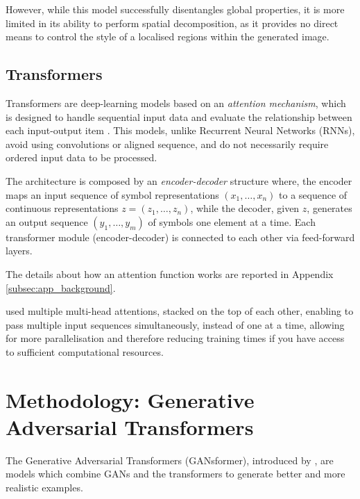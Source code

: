 \documentclass{article}
\begin{document}
	However, while this model successfully disentangles global properties, it is more limited in its ability 
	to perform spatial decomposition, as it provides no direct means to control the style of a localised 
	regions within the generated image.
	
	\subsection{Transformers}\label{sec:transformer}
	Transformers are deep-learning models based on an \textit{attention mechanism}, which is 
	designed 
	to handle sequential input data and evaluate the relationship between each input-output item 
	\cite{vaswani2017attention}.
	This models, unlike Recurrent Neural Networks (RNNs), avoid using convolutions or aligned 
	sequence, and do not necessarily require ordered input data to be processed. 
	
	The architecture is composed by an \textit{encoder-decoder} structure where, the {encoder} 
	maps 
	an input sequence of symbol representations $(x_1,\dots, x_n)$ to a sequence of continuous 
	representations $z = (z_1, \dots, z_n)$, while the  {decoder}, given $z$, generates an output 
	sequence $(y_1, \dots, y_m)$ of symbols one element at a time. 
	Each transformer module (encoder-decoder) is connected to each other via feed-forward 
	layers.
	
	The details about how an attention function works are reported in Appendix 
	\ref{subsec:app_background}. 
	
	\citet{vaswani2017attention} used multiple multi-head attentions, stacked on the top of each 
	other, 
	enabling to pass multiple input sequences simultaneously, instead of one at a time, allowing 
	for 
	more parallelisation and therefore reducing training times if you have access to sufficient 
	computational resources.
	
	\section{Methodology: Generative Adversarial Transformers}\label{sec:ganformer}
	
	The Generative Adversarial Transformers (GANsformer), introduced by 
	\citet{hudson2021generative}, are models which combine GANs and the transformers to 
	generate 
	better and more realistic examples.
	
\end{document}

